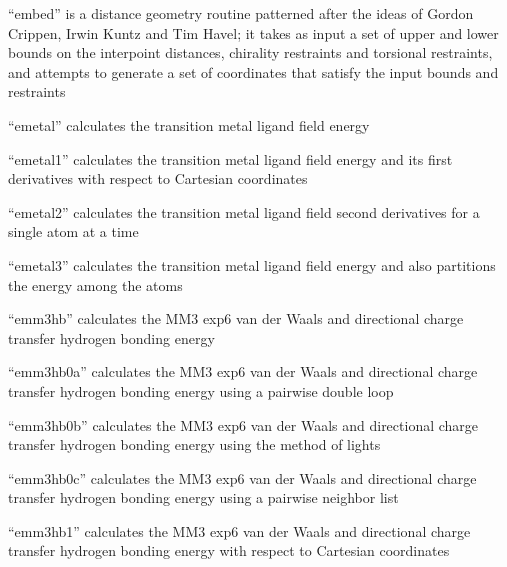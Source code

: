 \documentclass[letterpaper,11pt,english]{sphinxmanual}
\begin{document}

“embed” is a distance geometry routine patterned after the
ideas of Gordon Crippen, Irwin Kuntz and Tim Havel; it takes
as input a set of upper and lower bounds on the interpoint
distances, chirality restraints and torsional restraints,
and attempts to generate a set of coordinates that satisfy
the input bounds and restraints


“emetal” calculates the transition metal ligand field energy


“emetal1” calculates the transition metal ligand field energy
and its first derivatives with respect to Cartesian coordinates


“emetal2” calculates the transition metal ligand field second
derivatives for a single atom at a time


“emetal3” calculates the transition metal ligand field energy
and also partitions the energy among the atoms


“emm3hb” calculates the MM3 exp\sphinxhyphen{}6 van der Waals and directional
charge transfer hydrogen bonding energy


“emm3hb0a” calculates the MM3 exp\sphinxhyphen{}6 van der Waals and
directional charge transfer hydrogen bonding energy using
a pairwise double loop


“emm3hb0b” calculates the MM3 exp\sphinxhyphen{}6 van der Waals and
directional charge transfer hydrogen bonding energy using
the method of lights


“emm3hb0c” calculates the MM3 exp\sphinxhyphen{}6 van der Waals and
directional charge transfer hydrogen bonding energy using
a pairwise neighbor list


“emm3hb1” calculates the MM3 exp\sphinxhyphen{}6 van der Waals and directional
charge transfer hydrogen bonding energy with respect to Cartesian
coordinates
\end{document}
